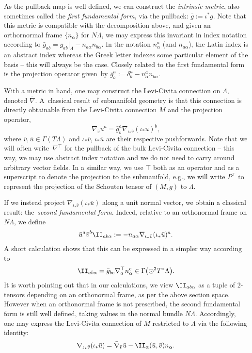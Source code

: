 As the pullback map is well defined, we can construct the \textit{intrinsic metric}, also sometimes called the \textit{first fundamental form}, via the pullback: $\bar{g} := \iota^* g$. Note that this metric is compatible with the decomposition above, and given an orthornormal frame $\{n_{\alpha}\}$ for $N \Lambda$, we may express this invariant in index notation according to $\bar{g}_{ab} = g_{ab}|_{\Lambda} - n_{a \alpha} n_{b \alpha}$. In the notation $n^a_{\alpha}$ (and $n_{a \alpha}$), the Latin index is an abstract index whereas the Greek letter indexes some particular element of the basis -- this will always be the case. Closely related to the first fundamental form is the projection operator given~by $\bar{g}^a_b := \delta^a_b - n^a_{\alpha} n_{b \alpha}$.

With a metric in hand, one may construct the Levi-Civita connection on $\Lambda$, denoted $\bar{\nabla}$. A~classical result of submanifold geometry is that this connection is directly obtainable from the Levi-Civita connection $M$ and the projection operator,
\[
\bar{\nabla}_{\bar v} \bar{u}^a = \bar{g}^a_b \nabla_{\iota_* \bar{v}} (\iota_* \bar{u})^b ,
\]
where $\bar{v},\bar{u} \in \Gamma(T \Lambda)$ and $\iota_* \bar{v}$, $\iota_* \bar{u}$ are their respective pushforwards. Note that we will often write~$\nabla^\top$ for the pullback of the bulk Levi-Civita connection -- this way, we may use abstract index notation and we do not need to carry around arbitrary vector fields. In a similar way, we use $\top$ both as an operator and as a superscript to denote the projection to the submanifold, e.g., we will write $P^\top$ to represent the projection of the Schouten tensor of $(M,g)$ to $\Lambda$.

If we instead project $\nabla_{\iota_* \bar{v}} (\iota_* \bar{u})$ along a unit normal vector, we obtain a classical result: the~\textit{second fundamental form}. Indeed, relative to an orthonormal frame on $N \Lambda$, we define
\[
\bar{u}^a \bar{v}^b \II_{ab \alpha} := -n_{a \alpha} \nabla_{\iota_* \bar{v}} (\iota_* \bar{u})^a .
\]
A short calculation shows that this can be expressed in a simpler way according to
\[
\II_{ab \alpha} = \bar{g}_{bc} \nabla^\top_a n^c_{\alpha} \in \Gamma\bigl(\odot^2 T^* \Lambda\bigr) .
\]
It is worth pointing out that in our calculations, we view $\II_{ab \alpha}$ as a tuple of 2-tensors depending on an orthonormal frame, as per the above section space. However when an orthonormal frame is not prescribed, the second fundamental form is still well defined, taking values in the normal bundle $N \Lambda$.
Accordingly, one may express the Levi-Civita connection of $M$ restricted to $\Lambda$ via the following identity:
\[
\nabla_{\iota_* \bar{v}} (\iota_* \bar{u}) = \bar{\nabla}_{\bar{v}} \bar{u} - \II_{\alpha}(\bar{u},\bar{v}) n_{\alpha} .
\]

